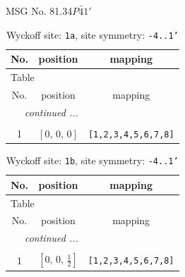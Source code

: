 \documentclass[fleqn,8pt]{jsarticle}
\begin{document}
\setcounter{MaxMatrixCols}{32}

\renewcommand{\tablename}{Table~}
\renewcommand{\figurename}{Figure~}
\begin{center}
\LARGE
MSG No. 81.34\quad$P\bar{4}1'$
\end{center}
\renewcommand{\arraystretch}{1.2}
\begin{longtable}{ccc}
\caption{Wyckoff site: {\tt 1a}, site symmetry: {\tt -4..1'}}
 \\
 \hline \hline
No. & position & mapping \\ \hline \endfirsthead

\multicolumn{2}{l}{\tablename\ \thetable{}} \\
 \hline \hline
No. & position & mapping \\ \hline \endhead

 \hline \hline
\multicolumn{2}{r}{\footnotesize\it continued ...} \\ \endfoot

 \hline \hline
\multicolumn{2}{r}{} \\ \endlastfoot

1 & $\left[ 0,\, 0,\, 0 \right]$ & {\tt [1,2,3,4,5,6,7,8]} \\
\end{longtable}
\renewcommand{\arraystretch}{1.2}
\begin{longtable}{ccc}
\caption{Wyckoff site: {\tt 1b}, site symmetry: {\tt -4..1'}}
 \\
 \hline \hline
No. & position & mapping \\ \hline \endfirsthead

\multicolumn{2}{l}{\tablename\ \thetable{}} \\
 \hline \hline
No. & position & mapping \\ \hline \endhead

 \hline \hline
\multicolumn{2}{r}{\footnotesize\it continued ...} \\ \endfoot

 \hline \hline
\multicolumn{2}{r}{} \\ \endlastfoot

1 & $\left[ 0,\, 0,\, \frac{1}{2} \right]$ & {\tt [1,2,3,4,5,6,7,8]} \\
\end{longtable}
\renewcommand{\arraystretch}{1.2}
\end{document}
